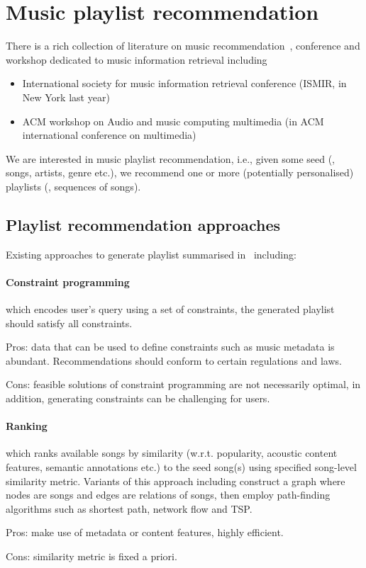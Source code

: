 \section{Music playlist recommendation}
\label{sec:playlist}

There is a rich collection of literature on music recommendation~\cite{recsysbook2015}, 
conference and workshop dedicated to music information retrieval including
\begin{itemize}
\item International society for music information retrieval conference (ISMIR, in New York last year)
\item ACM workshop on Audio and music computing multimedia (in ACM international conference on multimedia)
\end{itemize}

We are interested in music playlist recommendation, 
i.e., given some seed (\eg, songs, artists, genre etc.), 
we recommend one or more (potentially personalised) playlists (\ie, sequences of songs).


\subsection{Playlist recommendation approaches}

Existing approaches to generate playlist summarised in~\cite{recsysbook2015} including:

\paragraph{Constraint programming} which encodes user's query using a set of constraints, 
the generated playlist should satisfy all constraints.
\begin{description}
\item Pros: data that can be used to define constraints such as music metadata is abundant. 
            Recommendations should conform to certain regulations and laws.
\item Cons: feasible solutions of constraint programming are not necessarily optimal, in addition, 
            generating constraints can be challenging for users.
\end{description}

\paragraph{Ranking} which ranks available songs by similarity (w.r.t. popularity, acoustic content features, semantic annotations etc.) 
to the seed song(s) using specified song-level similarity metric.
Variants of this approach including construct a graph where nodes are songs and edges are relations of songs,
then employ path-finding algorithms such as shortest path, network flow and TSP.
\begin{description}
\item Pros: make use of metadata or content features, highly efficient.
\item Cons: similarity metric is fixed a priori.
\end{description}

